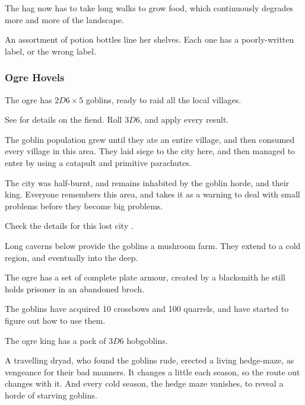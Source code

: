 \begin{multicols}{2}
\begin{dlist}
  The \gls{hag} now has to take long walks to grow food, which continuously degrades more and more of the landscape.
  \item
  An assortment of potion bottles line her shelves.
  Each one has a poorly-written label, or the wrong label.
\end{dlist}

\subsubsection{Ogre Hovels}
\label{ogrePoint}

The \gls{ogre} has $2D6 \times 5$ goblins, ready to raid all the local \glspl{village}.

See  for details on the fiend.
Roll $3D6$, and apply every result.

\begin{dlist}
  \item
  The goblin population grew until they ate an entire \gls{village}, and then consumed every \gls{village} in this area.
  They laid siege to the city here, and then managed to enter by using a catapult and primitive parachutes.

  The city was half-burnt, and remains inhabited by the goblin horde, and their king.
  Everyone remembers this area, and takes it as a warning to deal with small problems before they become big problems.

  Check the details for this lost city .
  \item
  Long caverns below provide the goblins a mushroom farm.
  They extend to a cold region, and eventually into the \gls{deep}.
  \item
  The \gls{ogre} has a set of complete plate armour, created by a blacksmith he still holds prisoner in an abandoned \gls{broch}.
  \item
  The goblins have acquired 10 crossbows and 100 quarrels, and have started to figure out how to use them.
  \item
  The \gls{ogre} king has a pack of $3D6$ hobgoblins.
  \item
  A travelling dryad, who found the goblins rude, erected a living hedge-maze, as vengeance for their bad manners.
  It changes a little each season, so the route out changes with it.
  And every cold season, the hedge maze vanishes, to reveal a horde of starving goblins.
\end{dlist}


\end{multicols}
